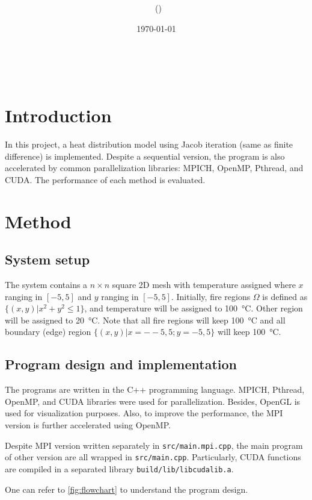 \documentclass[twoside,12pt]{article}
\title{{\lms \Code \ \Ass}}
\author{\lms \name \ (\href{mailto:\mail}{\mail})}
\date{\sffamily \today}
\makeatletter
\theoremstyle{definition}
\theoremstyle{remark}
\renewcommand{\maketitle}{\bgroup\setlength{\parindent}{0pt}
\begin{center}
  \textbf{\Large\@title}\\
  \@author
\end{center}\egroup
}
\makeatother
\begin{document}
\begin{titlepage}
    \maketitle
    \thispagestyle{title}
\end{titlepage}

\section{Introduction}
In this project, a heat distribution model using Jacob iteration (same as finite difference)
is implemented.
Despite a sequential version, the program is also accelerated by
common parallelization libraries: MPICH, OpenMP, Pthread, and CUDA.
The performance of each method is evaluated.




\section{Method}
\subsection{System setup}
The system contains a $n\times n$ square 2D mesh 
with temperature assigned
where $x$ ranging in $[-5,5]$ and $y$ ranging in $[-5,5]$.
Initially, fire regions $\Omega$ is defined as $\{(x,y)|x^2+y^2\leq 1\}$,
and temperature will be assigned to \SI{100}{\celsius}.
Other region will be assigned to \SI{20}{\celsius}.
Note that all fire regions will keep \SI{100}{\celsius}
and all boundary (edge) region $\{(x,y)|x=--5,5; y=-5,5\}$
will keep \SI{100}{\celsius}.


\subsection{Program design and implementation}
The programs are written in the C++ programming language.
MPICH, Pthread, OpenMP, and CUDA libraries were used for parallelization.
Besides, OpenGL is used for visualization purposes.
Also, to improve the performance, the MPI version is further accelerated
using OpenMP.

Despite MPI version written separately in \lstinline|src/main.mpi.cpp|, 
the main program of other version are all wrapped
in \lstinline|src/main.cpp|.
Particularly, CUDA functions are compiled in a separated library
\lstinline|build/lib/libcudalib.a|.

One can refer to \ref{fig:flowchart} to understand the program design.
\end{document}
